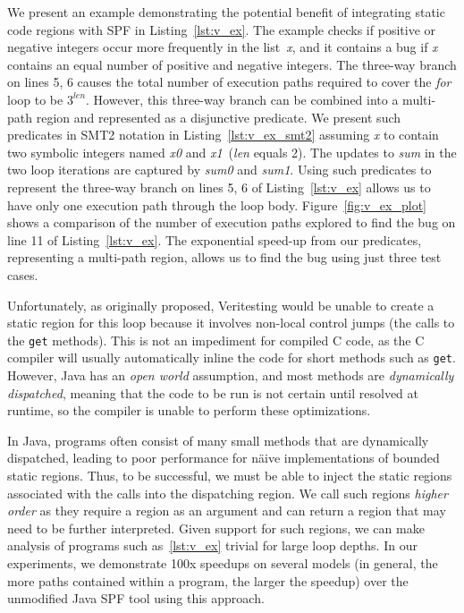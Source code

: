 



%
%
We present an example demonstrating the potential benefit of integrating static code regions with SPF in Listing~\ref{lst:v_ex}.
%
The example checks if positive or negative integers occur more frequently in the
list~\textit{x}, and it contains a bug if \textit{x} contains an
equal number of positive and negative integers.
%
The three-way branch on lines 5, 6 causes the total number of execution
paths required to cover the \textit{for} loop to be $3^{\textit{len}}$.
%
However, this three-way branch can be combined into a multi-path region
and represented as a disjunctive predicate.
We present such predicates in SMT2 notation in
Listing~\ref{lst:v_ex_smt2} assuming \textit{x} to contain two symbolic
integers named \textit{x0} and \textit{x1}~(\textit{len} equals 2).
%
The updates to \textit{sum} in the two loop iterations are captured by
\textit{sum0} and \textit{sum1}.
%
Using such predicates to represent the three-way branch on lines 5, 6 of
Listing~\ref{lst:v_ex} allows us to have only one execution path through
the loop body.
%
Figure~\ref{fig:v_ex_plot} shows a comparison of the number of execution
paths explored to find the bug on line 11 of Listing~\ref{lst:v_ex}.
%
The exponential speed-up from our predicates, representing a multi-path
region, allows us to find
the bug using just three test cases.

Unfortunately, as originally proposed, Veritesting would be unable to create a static region for this loop because it involves non-local control jumps (the calls to the \texttt{get} methods).  This is not an impediment for compiled C code, as the C compiler will usually automatically inline the code for short methods such as \texttt{get}.  However, Java has an {\em open world} assumption, and most methods are {\em dynamically dispatched}, meaning that the code to be run is not certain until resolved at runtime, so the compiler is unable to perform these optimizations.

In Java, programs often consist of many small methods that are dynamically dispatched, leading to poor performance for n\"aive implementations of bounded static regions.  Thus, to be successful, we must be able to inject the static regions associated with the calls into the dispatching region.  We call such regions {\em higher order} as they require a region as an argument and can return a region that may need to be further interpreted.
Given support for such regions, we can make analysis of programs such as~\ref{lst:v_ex} trivial for large loop depths.  In our experiments, we demonstrate 100x speedups on several models (in general, the more paths contained within a program, the larger the speedup) over the unmodified Java SPF tool using this approach.
 
